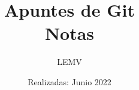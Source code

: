\documentclass{article}
\title{Apuntes de Git\\
\Large{Notas}}
\author{LEMV}
\date{Realizadas: Junio 2022}
\begin{document}
\renewcommand*\contentsname{Índice}
\renewcommand{\listfigurename}{Índice de figuras}

\maketitle\newpage
\tableofcontents\newpage
\listoffigures\newpage


\end{document}
